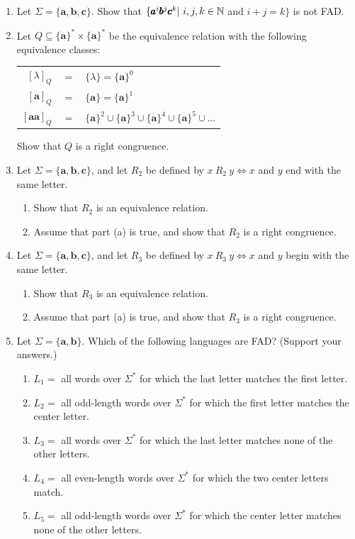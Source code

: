 \begin{enumerate}[{2.}1.]
\item Let $\Sigma=\{\pmb{a},\pmb{b},\pmb{c}\}$. Show that $\{\pmb{a}^i\pmb{b}^j
\pmb{c}^k |\ i,j,k \in \mathbb{N}$ and $i + j = k\}$ is not FAD.

\item Let $Q \subseteq \{\pmb{a}\}^* \times \{\pmb{a}\}^*$ be the equivalence
relation with the following equivalence classes:
\begin{center}\begin{tabular}{rcl}
$[\lambda]_Q$ & $=$ & $\{\lambda\} = \{\pmb{a}\}^0$ \\
$[\pmb{a}]_Q$ & $=$ & $\{\pmb{a}\} = \{\pmb{a}\}^1$ \\
$[\pmb{aa}]_Q$ & $=$ & $\{\pmb{a}\}^2 \cup \{\pmb{a}\}^3 \cup \{\pmb{a}\}^4 \cup
\{\pmb{a}\}^5 \cup \ldots$ \\
\end{tabular}\end{center}
Show that $Q$ is a right congruence.

\item Let $\Sigma=\{\pmb{a},\pmb{b},\pmb{c}\}$, and let $R_2$ be defined by
$x\ R_2\ y \Leftrightarrow x$ and $y$ end with the same letter.
\begin{enumerate}
\item Show that $R_2$ is an equivalence relation.
\item Assume that part (a) is true, and show that $R_2$ is a right congruence.
\end{enumerate}

\item Let $\Sigma=\{\pmb{a},\pmb{b},\pmb{c}\}$, and let $R_3$ be defined by
$x\ R_3\ y \Leftrightarrow x$ and $y$ begin with the same letter.
\begin{enumerate}
\item Show that $R_3$ is an equivalence relation.
\item Assume that part (a) is true, and show that $R_3$ is a right congruence.
\end{enumerate}

\item Let $\Sigma=\{\pmb{a},\pmb{b}\}$. Which of the following languages are
FAD? (Support your answers.)
\begin{enumerate}
\item $L_1 =$ all words over $\Sigma^*$ for which the last letter matches the
first letter.
\item $L_2 =$ all odd-length words over $\Sigma^*$ for which the first letter
matches the center letter.
\item $L_3 =$ all words over $\Sigma^*$ for which the last letter matches none
of the other letters.
\item $L_4 =$ all even-length words over $\Sigma^*$ for which the two center
letters match.
\item $L_5 =$ all odd-length words over $\Sigma^*$ for which the center letter
matches none of the other letters.
\end{enumerate}


\end{enumerate}
